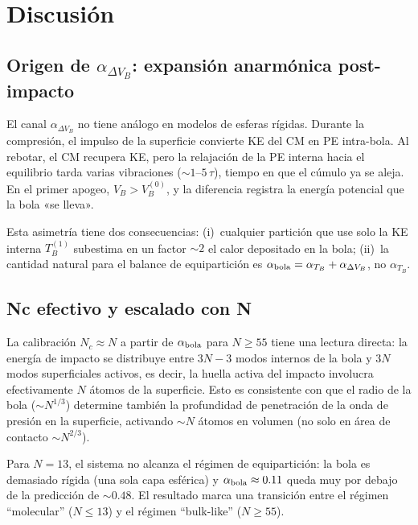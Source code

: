 \documentclass[aps,pre,twocolumn,reprint,superscriptaddress]{revtex4-2}
\begin{document}
\section{Discusión}
\label{sec:discusion}

\subsection{Origen de \texorpdfstring{$\alpha_{\Delta V_B}$}{α\_ΔVB}:
expansión anarmónica post-impacto}
\label{sec:anarmonico}

El canal $\alpha_{\Delta V_B}$ no tiene análogo en modelos de esferas rígidas.
Durante la compresión, el impulso de la superficie convierte KE del CM en PE
intra-bola. Al rebotar, el CM recupera KE, pero la relajación de la PE interna
hacia el equilibrio tarda varias vibraciones ($\sim1$--$5\,\tau$), tiempo en que
el cúmulo ya se aleja. En el primer apogeo, $V_B>V_B^{(0)}$, y la diferencia
registra la energía potencial que la bola «se lleva».

Esta asimetría tiene dos consecuencias: (i)~cualquier partición que use solo
la KE interna $T_B^{(1)}$ subestima en un factor $\sim2$ el calor depositado
en la bola; (ii)~la cantidad natural para el balance de equipartición es
$\alpha_{\rm bola}=\alpha_{T_B}+\alpha_{\Delta V_B}$, no $\alpha_{T_B}$.

\subsection{Nc efectivo y escalado con N}
\label{sec:Nc_interpretacion}

La calibración $N_c\approx N$ a partir de $\alpha_{\rm bola}$ para $N\geq55$
tiene una lectura directa: la energía de impacto se distribuye entre $3N-3$
modos internos de la bola y $3N$ modos superficiales activos, es decir, la
huella activa del impacto involucra efectivamente $N$ átomos de la superficie.
Esto es consistente con que el radio de la bola ($\sim N^{1/3}$) determine
también la profundidad de penetración de la onda de presión en la superficie,
activando $\sim N$ átomos en volumen (no solo en área de contacto $\sim N^{2/3}$).

Para $N=13$, el sistema no alcanza el régimen de equipartición: la bola es
demasiado rígida (una sola capa esférica) y $\alpha_{\rm bola}\approx0.11$
queda muy por debajo de la predicción de $\sim0.48$. El resultado marca una
transición entre el régimen ``molecular'' ($N\leq13$) y el régimen ``bulk-like''
($N\geq55$).
\end{document}

